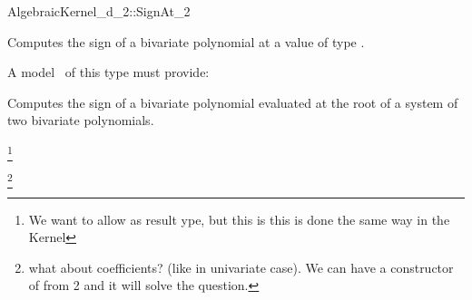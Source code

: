 \begin{ccRefConcept}{AlgebraicKernel_d_2::SignAt_2}

\ccDefinition
Computes the sign of a bivariate polynomial 
 at a value of type 
. 

\ccRefines 
{}


A model \ccVar\ of this type must provide:

{Computes the sign of a bivariate polynomial  evaluated at the root 
 of a system of two bivariate polynomials.} 

\footnote{We want to allow  as result ype,
but this is this is done the same way in the Kernel}

\footnote{what about coefficients? (like in univariate case). We can have 
a constructor of  from 2  and it 
will solve the question.}

\end{ccRefConcept}
